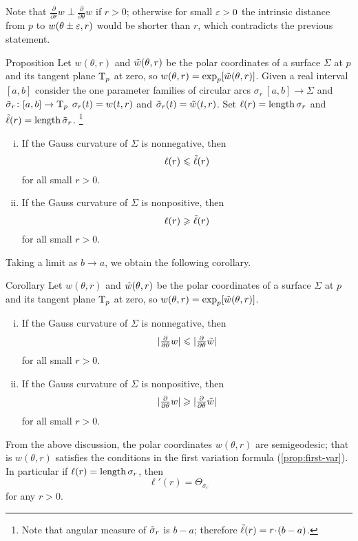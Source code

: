 Note that $\tfrac{\partial}{\partial r}w\perp \tfrac{\partial}{\partial \theta}w$ if $r>0$;
otherwise for small $\eps>0$ the intrinsic distance from $p$ to $w(\theta\pm \eps,r)$ would be shorter than $r$, which contradicts the previous statement.

\begin{thm}{Proposition}
Let $w(\theta,r)$ and $\~w(\theta,r)$ be the polar coordinates of a surface $\Sigma$ at $p$ and its tangent plane $\T_p$ at zero, so $w(\theta,r)\z=\exp_p[\~w(\theta,r)]$.
Given a real interval $[a,b]$ consider the one parameter families of circular arcs $\sigma_r\:[a,b]\to \Sigma$ and $\~\sigma_r\:[a,b]\to \T_p$
$\sigma_r(t)\z=w(t,r)$ and $\~\sigma_r(t)=\~w(t,r)$.
Set $\ell(r)=\length \sigma_r$ and $\~\ell(r)\z=\length \~\sigma_r$.%
\footnote{Note that angular measure of $\~\sigma_r$ is $b-a$; therefore $\~\ell(r)=r\cdot(b-a)$.}

\begin{enumerate}[(i)]
 \item If the Gauss curvature of $\Sigma$ is nonnegative, then 
 \[\ell(r)\le \~\ell(r)\]
 for all small $r>0$.
 \item If the Gauss curvature of $\Sigma$ is nonpositive, then 
 \[\ell(r)\ge \~\ell(r)\]
 for all small $r>0$.
\end{enumerate}

\end{thm}

Taking a limit as $b\to a$, we obtain the following corollary.

\begin{thm}{Corollary}\label{cor:w<w}
Let $w(\theta,r)$ and $\~w(\theta,r)$ be the polar coordinates of a surface $\Sigma$ at $p$ and its tangent plane $\T_p$ at zero, so $w(\theta,r)\z=\exp_p[\~w(\theta,r)]$.
\begin{enumerate}[(i)]
 \item If the Gauss curvature of $\Sigma$ is nonnegative, then 
 \[|\tfrac{\partial}{\partial \theta} w|\le |\tfrac{\partial}{\partial \theta} \~w|\]
 for all small $r>0$.
 \item If the Gauss curvature of $\Sigma$ is nonpositive, then 
\[|\tfrac{\partial}{\partial \theta} w|\ge |\tfrac{\partial}{\partial \theta} \~w|\]
 for all small $r>0$.
\end{enumerate}
\end{thm}


From the above discussion, the polar coordinates $w(\theta,r)$ are semigeodesic;
that is $w(\theta,r)$ satisfies the conditions in the first variation formula (\ref{prop:first-var}).
In particular if $\ell(r)=\length \sigma_r$, then
\[\ell'(r)=\Theta_{\sigma_r}\]
for any $r>0$.

